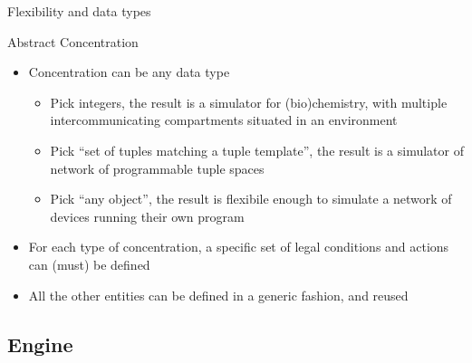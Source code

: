 \documentclass[presentation]{beamer} %
\begin{document}

\begin{frame}{Flexibility and data types}
  \begin{block}{Abstract Concentration}
    \begin{itemize}
    \item Concentration can be any data type
      \begin{itemize}
        \item Pick integers, the result is a simulator for (bio)chemistry, with multiple intercommunicating compartments situated in an environment \cite{drosophila}
        \item Pick ``set of tuples matching a tuple template'', the result is a simulator of network of programmable tuple spaces
        \item Pick ``any object'', the result is flexibile enough to simulate a network of devices running their own program \cite{protelis}
      \end{itemize}
    \item For each type of concentration, a specific set of legal conditions and actions can (must) be defined
    \item All the other entities can be defined in a generic fashion, and reused 
    \end{itemize}
  \end{block}
\end{frame}

\subsection{Engine}
\end{document}
